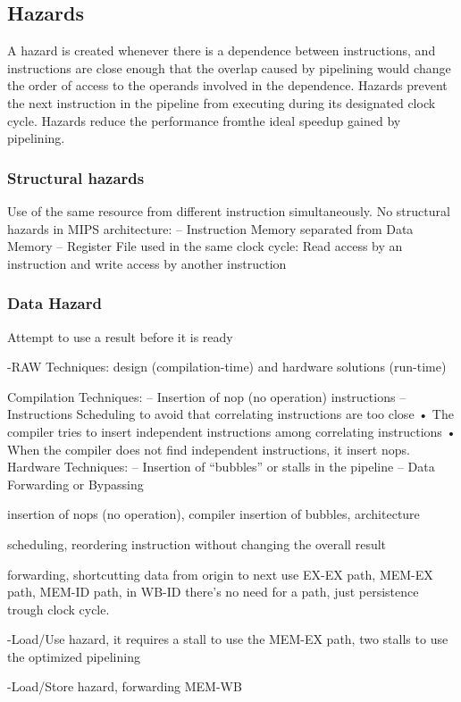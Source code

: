 \subsection{Hazards}\label{subsec:hazards}
A hazard is created whenever there is a dependence between instructions, and instructions are close enough that the
overlap caused by pipelining would change the order of access to the operands involved in the dependence.
Hazards prevent the next instruction in the pipeline from executing during its designated clock cycle.
Hazards reduce the performance fromthe ideal speedup gained by pipelining.

\subsubsection{Structural hazards}
Use of the same resource from different instruction simultaneously.
No structural hazards in MIPS architecture:
– Instruction Memory separated from Data Memory
– Register File used in the same clock cycle: Read access by an instruction and write access by another instruction

\subsubsection{Data Hazard}
Attempt to use a result before it is ready

-RAW
Techniques: design (compilation-time) and hardware solutions (run-time)

Compilation Techniques:
– Insertion of nop (no operation) instructions
– Instructions Scheduling to avoid that correlating instructions are too close
    • The compiler tries to insert independent instructions among correlating instructions
    • When the compiler does not find independent instructions, it insert nops.
Hardware Techniques:
– Insertion of “bubbles” or stalls in the pipeline
– Data Forwarding or Bypassing

insertion of nops (no operation), compiler
insertion of bubbles, architecture

scheduling, reordering instruction without changing the overall result

forwarding, shortcutting data from origin to next use EX-EX path, MEM-EX path, MEM-ID path, in WB-ID there's no
need for a path, just persistence trough clock cycle.

-Load/Use hazard, it requires a stall to use the MEM-EX path, two stalls to use the optimized pipelining

-Load/Store hazard, forwarding MEM-WB

